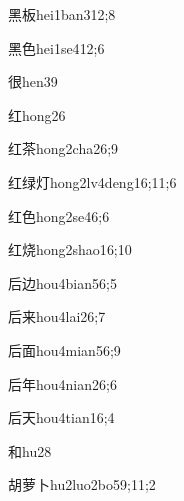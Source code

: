 \begin{verbete}{黑板}{hei1ban3}{12;8}
\end{verbete}
\begin{verbete}{黑色}{hei1se4}{12;6}
\end{verbete}
\begin{verbete}{很}{hen3}{9}
\end{verbete}
\begin{verbete}{红}{hong2}{6}
\end{verbete}
\begin{verbete}{红茶}{hong2cha2}{6;9}
\end{verbete}
\begin{verbete}{红绿灯}{hong2lv4deng1}{6;11;6}
\end{verbete}
\begin{verbete}{红色}{hong2se4}{6;6}
\end{verbete}
\begin{verbete}{红烧}{hong2shao1}{6;10}
\end{verbete}
\begin{verbete}{后边}{hou4bian5}{6;5}
\end{verbete}
\begin{verbete}{后来}{hou4lai2}{6;7}
\end{verbete}
\begin{verbete}{后面}{hou4mian5}{6;9}
\end{verbete}
\begin{verbete}{后年}{hou4nian2}{6;6}
\end{verbete}
\begin{verbete}{后天}{hou4tian1}{6;4}
\end{verbete}
\begin{verbete}{和}{hu2}{8}
\end{verbete}
\begin{verbete}{胡萝卜}{hu2luo2bo5}{9;11;2}
\end{verbete}
